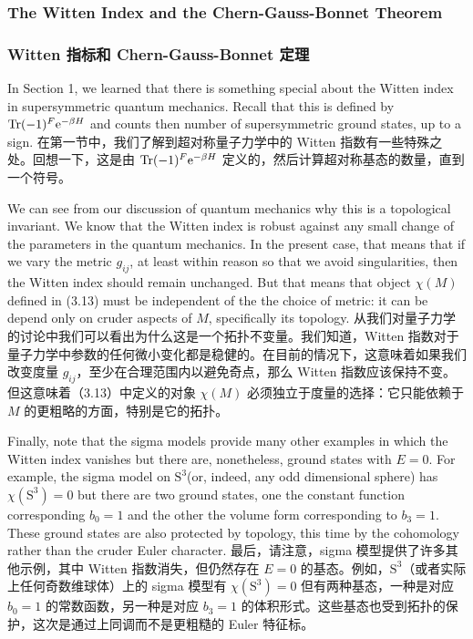 \documentclass{article}
\newcommand{\rme}{\mathrm{e}}
\begin{document}
\begin{paracol}{2}
\subsubsection{The Witten Index and the Chern-Gauss-Bonnet Theorem}
\switchcolumn
\subsubsection*{Witten 指标和 Chern-Gauss-Bonnet 定理}
\switchcolumn*

In Section 1, we learned that there is something special about the Witten index in supersymmetric quantum mechanics. Recall that this is deﬁned by $\Tr (- 1)^{F} \rme^{- \beta H}$ and counts then number of supersymmetric ground states, up to a sign.
\switchcolumn
在第一节中，我们了解到超对称量子力学中的 Witten 指数有一些特殊之处。回想一下，这是由 $\Tr (- 1)^{F} \rme^{- \beta H}$ 定义的，然后计算超对称基态的数量，直到一个符号。
\switchcolumn*

We can see from our discussion of quantum mechanics why this is a topological invariant. We know that the Witten index is robust against any small change of the parameters in the quantum mechanics. In the present case, that means that if we vary the metric $g_{ij}$, at least within reason so that we avoid singularities, then the Witten index should remain unchanged. But that means that object $\chi(M)$ deﬁned in (3.13) must be independent of the the choice of metric: it can be depend only on cruder aspects of $M$, speciﬁcally its topology.
\switchcolumn
从我们对量子力学的讨论中我们可以看出为什么这是一个拓扑不变量。我们知道，Witten 指数对于量子力学中参数的任何微小变化都是稳健的。在目前的情况下，这意味着如果我们改变度量 $g_{ij}$，至少在合理范围内以避免奇点，那么 Witten 指数应该保持不变。但这意味着（3.13）中定义的对象 $\chi(M)$ 必须独立于度量的选择：它只能依赖于 $M$ 的更粗略的方面，特别是它的拓扑。
\switchcolumn*

Finally, note that the sigma models provide many other examples in which the Witten index vanishes but there are, nonetheless, ground states with $E = 0$. For example, the sigma model on $\bm{\mathrm{S}}^3$(or, indeed, any odd dimensional sphere) has $\chi(\bm{\mathrm{S}}^3) = 0$ but there are two ground states, one the constant function corresponding $b_0 = 1$ and the other the volume form corresponding to $b_3 = 1$. These ground states are also protected by topology, this time by the cohomology rather than the cruder Euler character.
\switchcolumn
最后，请注意，sigma 模型提供了许多其他示例，其中 Witten 指数消失，但仍然存在 $E = 0$ 的基态。例如，$\bm{\mathrm{S}}^3$（或者实际上任何奇数维球体）上的 sigma 模型有 $\chi(\bm{\mathrm{S}}^3) = 0$ 但有两种基态，一种是对应 $b_0 = 1$ 的常数函数，另一种是对应 $b_3 = 1$ 的体积形式。这些基态也受到拓扑的保护，这次是通过上同调而不是更粗糙的 Euler 特征标。
\switchcolumn*


\end{paracol}
\end{document}
